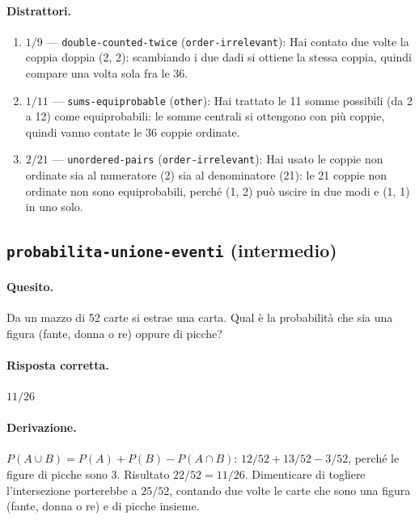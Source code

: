 \paragraph{Distrattori.}
\begin{enumerate}
  \item $1/9$ --- \texttt{double-counted-twice} (\texttt{order-irrelevant}): Hai contato due volte la coppia doppia (2, 2): scambiando i due dadi si ottiene la stessa coppia, quindi compare una volta sola fra le 36.
  \item $1/11$ --- \texttt{sums-equiprobable} (\texttt{other}): Hai trattato le 11 somme possibili (da 2 a 12) come equiprobabili: le somme centrali si ottengono con più coppie, quindi vanno contate le 36 coppie ordinate.
  \item $2/21$ --- \texttt{unordered-pairs} (\texttt{order-irrelevant}): Hai usato le coppie non ordinate sia al numeratore (2) sia al denominatore (21): le 21 coppie non ordinate non sono equiprobabili, perché (1, 2) può uscire in due modi e (1, 1) in uno solo.
\end{enumerate}

\subsection{\texorpdfstring{\texttt{probabilita-unione-eventi} (intermedio)}{probabilita-unione-eventi (intermedio)}}

\paragraph{Quesito.} Da un mazzo di 52 carte si estrae una carta. Qual è la probabilità che sia una figura (fante, donna o re) oppure di picche?

\paragraph{Risposta corretta.} $11/26$

\paragraph{Derivazione.} $P(A \cup  B) = P(A) + P(B) - P(A \cap  B)$: $12/52 + 13/52 - 3/52$, perché le figure di picche sono 3. Risultato $22/52 = 11/26$. Dimenticare di togliere l'intersezione porterebbe a $25/52$, contando due volte le carte che sono una figura (fante, donna o re) e di picche insieme.

